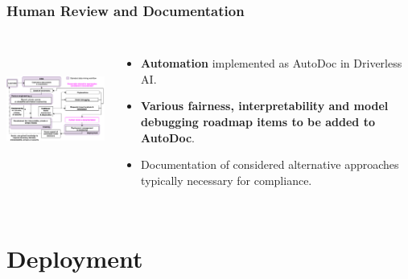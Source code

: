 \documentclass[11pt,
               aspectratio=169,
               hyperref={colorlinks}
               ]{beamer}
\begin{document}
		\begin{frame}
		
			\frametitle{Human Review and Documentation}		
			
			\begin{columns}
	
				\centering
				\includegraphics[height=120pt]{img/hr.png}
				
				\vspace{-5pt}
				\begin{itemize}
					\item \textbf{Automation} implemented as AutoDoc in Driverless AI.
					\item \textbf{Various fairness, interpretability and model debugging roadmap items to be added to AutoDoc}.
					\item Documentation of considered alternative approaches typically necessary for compliance.
				\end{itemize}
				
			\end{columns}
		
		\end{frame}

	\section{Deployment}
\end{document}
